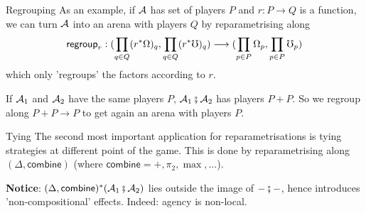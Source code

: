 \begin{frame}{Regrouping}
	As an example, if $\mathcal{A}$ has set of players $P$ and $r : P \to Q$ is a function, we can turn $\mathcal{A}$ into an arena with players $Q$ by reparametrising along
	\begin{equation*}
		\regroup_r : (\prod_{q \in Q} (r^* \Omega)_q, \prod_{q \in Q} (r^* \Comega)_q) \longto (\prod_{p \in P} \Omega_p, \prod_{p \in P} \Comega_p)
	\end{equation*}
	which only 'regroups' the factors according to $r$.
	\begin{example}
		If $\mathcal{A}_1$ and $\mathcal{A}_2$ have the same players $P$, $\mathcal{A}_1 \fatsemi \mathcal{A}_2$ has players $P+P$. So we regroup along $P+P \to P$ to get again an arena with players $P$.
	\end{example}
\end{frame}

\begin{frame}{Tying}
	The second most important application for reparametrisations is tying strategies at different point of the game. This is done by reparametrising along $(\Delta, \mathsf{combine})$ (where $\mathsf{combine} = +, \pi_2, \max, \ldots$).

	\vfill
	\textbf{Notice}: $(\Delta, \mathsf{combine})^*(\mathcal{A}_1 \fatsemi \mathcal{A}_2)$ lies outside the image of $-\fatsemi-$, hence introduces 'non-compositional' effects. Indeed: \textcolor{coloragents}{agency} is non-local.
\end{frame}
